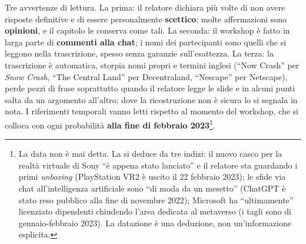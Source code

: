 Tre avvertenze di lettura. La prima: il relatore dichiara più volte di non avere
risposte definitive e di essere personalmente \textbf{scettico}; molte
affermazioni sono \textbf{opinioni}, e il capitolo le conserva come tali. La
seconda: il workshop è fatto in larga parte di \textbf{commenti alla chat}; i
nomi dei partecipanti sono quelli che si leggono nella trascrizione, spesso
senza garanzie sull'esattezza. La terza: la trascrizione è automatica, storpia
nomi propri e termini inglesi (``Now Crash'' per \emph{Snow Crash}, ``The
Central Land'' per Decentraland, ``Nescape'' per Netscape), perde pezzi di frase
soprattutto quando il relatore legge le slide e in alcuni punti salta da un
argomento all'altro; dove la ricostruzione non è sicura lo si segnala in nota. I
riferimenti temporali vanno letti rispetto al momento del workshop, che si
colloca con ogni probabilità \textbf{alla fine di febbraio
2023}\footnote{La data non è mai detta. La si deduce da tre indizi: il nuovo
casco per la realtà virtuale di Sony ``è appena stato lanciato'' e il relatore
sta guardando i primi \emph{unboxing} (PlayStation VR2 è uscito il 22 febbraio
2023); le sfide via chat all'intelligenza artificiale sono ``di moda da un
mesetto'' (ChatGPT è stato reso pubblico alla fine di novembre 2022); Microsoft
ha ``ultimamente'' licenziato dipendenti chiudendo l'area dedicata al metaverso
(i tagli sono di gennaio-febbraio 2023). La datazione è una deduzione, non
un'informazione esplicita.}.

